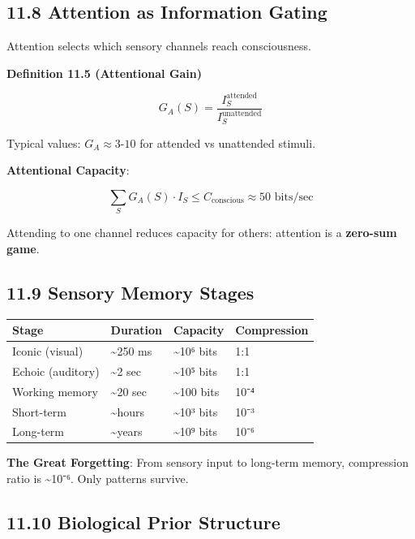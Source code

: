 \documentclass[
  11pt,
  letterpaper,
  twoside,
  openright]{book}
\begin{document}
\subsection{11.8 Attention as Information
Gating}\label{attention-as-information-gating}

Attention selects which sensory channels reach consciousness.

\textbf{Definition 11.5 (Attentional Gain)}

\[G_A(S) = \frac{I_S^{\text{attended}}}{I_S^{\text{unattended}}}\]

Typical values: \(G_A \approx 3\)-\(10\) for attended vs unattended
stimuli.

\textbf{Attentional Capacity}:

\[\sum_S G_A(S) \cdot I_S \leq C_{\text{conscious}} \approx 50 \text{ bits/sec}\]

Attending to one channel reduces capacity for others: attention is a
\textbf{zero-sum game}.

\subsection{11.9 Sensory Memory Stages}\label{sensory-memory-stages}

\begin{longtable}[]{@{}llll@{}}
\toprule\noalign{}
Stage & Duration & Capacity & Compression \\
\midrule\noalign{}
\endhead
\bottomrule\noalign{}
\endlastfoot
Iconic (visual) & \textasciitilde250 ms & \textasciitilde10⁶ bits &
1:1 \\
Echoic (auditory) & \textasciitilde2 sec & \textasciitilde10⁵ bits &
1:1 \\
Working memory & \textasciitilde20 sec & \textasciitilde100 bits &
10⁻⁴ \\
Short-term & \textasciitilde hours & \textasciitilde10³ bits & 10⁻³ \\
Long-term & \textasciitilde years & \textasciitilde10⁹ bits & 10⁻⁶ \\
\end{longtable}

\textbf{The Great Forgetting}: From sensory input to long-term memory,
compression ratio is \textasciitilde10⁻⁶. Only patterns survive.

\subsection{11.10 Biological Prior
Structure}\label{biological-prior-structure}
\end{document}
